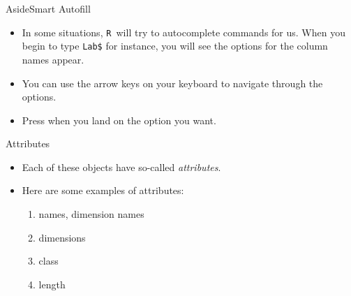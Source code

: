 \documentclass[xcolor=svgnames, 10pt]{beamer}
\makeatletter
\newcommand{\R}{{\tt R }}
\newcommand{\hlnum}[1]{\textcolor[rgb]{0.686,0.059,0.569}{#1}}%
\newcommand{\hlopt}[1]{\textcolor[rgb]{0,0,0}{#1}}%
\newcommand{\hlstd}[1]{\textcolor[rgb]{0.345,0.345,0.345}{#1}}%
\newcommand{\hlkwb}[1]{\textcolor[rgb]{0.69,0.353,0.396}{#1}}%
\newcommand{\hlkwd}[1]{\textcolor[rgb]{0.737,0.353,0.396}{\textbf{#1}}}%
\newenvironment{kframe}{%
 \def\at@end@of@kframe{}%
 \ifinner\ifhmode%
  \def\at@end@of@kframe{\end{minipage}}%
  \begin{minipage}{\columnwidth}%
 \fi\fi%
 \def\FrameCommand##1{\hskip\@totalleftmargin \hskip-\fboxsep
 \colorbox{shadecolor}{##1}\hskip-\fboxsep
     \hskip-\linewidth \hskip-\@totalleftmargin \hskip\columnwidth}%
 \MakeFramed {\advance\hsize-\width
   \@totalleftmargin\z@ \linewidth\hsize
   \@setminipage}}%
 {\par\unskip\endMakeFramed%
 \at@end@of@kframe}
\newenvironment{knitrout}{}{} %
\makeatother
\begin{document}
\begin{frame}[fragile]{Aside}{Smart Autofill}
\begin{itemize}
\item In some situations, \R will try to autocomplete commands for us.  When you begin to type {\tt Lab\$} for instance, you will see the options for the column names appear.
\item You can use the arrow keys on your keyboard to navigate through the options.
\item Press  when you land on the option you want.
\end{itemize}
\end{frame}


\begin{frame}[fragile]{Attributes}
\begin{itemize}
\item Each of these objects have so-called \emph{attributes}. %
\item Here are some examples of attributes:
\begin{enumerate}
\item names, dimension names
\item dimensions
\item class
\item length
\end{enumerate}
\end{itemize}
\end{frame}
\end{document}
